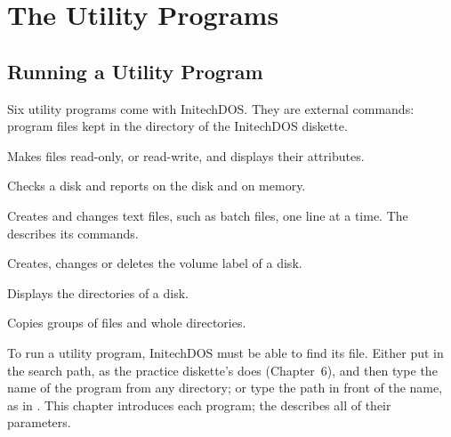 \chapter{The Utility Programs}

\section{Running a Utility Program}
Six utility programs come with InitechDOS.  They are external commands:
program files kept in the directory  of the InitechDOS
diskette.

Makes files read-only, or read-write, and displays their
attributes.

Checks a disk and reports on the disk and on memory.

Creates and changes text files, such as batch files, one
line at a time.  The  describes its
commands.

Creates, changes or deletes the volume label of a disk.

Displays the directories of a disk.

Copies groups of files and whole directories.

To run a utility program, InitechDOS must be able to find its file.  Either
put  in the search path, as the practice diskette's
 does (Chapter~6), and then type the name of the program
from any directory; or type the path in front of the name, as in
.  This chapter introduces each program; the
 describes all of their parameters.


